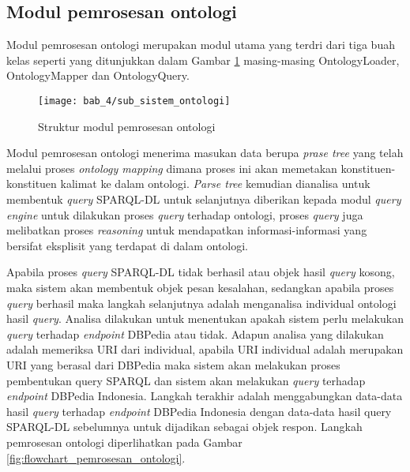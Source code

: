

\subsection{Modul pemrosesan ontologi}
Modul pemrosesan ontologi merupakan modul utama yang terdri dari tiga buah kelas seperti yang ditunjuk\-kan dalam Gambar \ref{fig:sub_sistem_ontologi} masing-masing OntologyLoader, OntologyMapper dan OntologyQuery. 

\begin{figure}[hb]
    \centering
    \texttt{[image: bab\_4/sub\_sistem\_ontologi]}
    \caption{Struktur modul pemrosesan ontologi} 
    \label{fig:sub_sistem_ontologi}
\end{figure}

Modul pemrosesan ontologi menerima masukan data berupa \emph{prase tree} yang telah melalui proses \emph{ontology mapping} dimana proses ini akan memetakan konstituen-konstituen kalimat ke dalam ontologi. \emph{Parse tree} kemudian dianalisa untuk membentuk \emph{query} SPARQL-DL untuk selanjutnya diberikan kepada modul \emph{query engine} untuk dilakukan proses \emph{query} terhadap ontologi, proses \emph{query} juga melibatkan proses \emph{reasoning} untuk mendapatkan informasi-informasi yang bersifat eksplisit yang terdapat di dalam ontologi.

Apabila proses \emph{query} SPARQL-DL tidak berhasil atau objek hasil \emph{query} kosong, maka sistem akan membentuk objek pesan kesalahan, sedangkan apabila proses \emph{query} berhasil maka langkah selanjutnya adalah menganalisa individual ontologi hasil \emph{query}. Analisa dilakukan untuk menentukan apakah sistem perlu melakukan \emph{query} terhadap \emph{endpoint} DBPedia atau tidak. Adapun analisa yang dilakukan adalah memeriksa URI dari individual, apabila URI individual adalah merupakan URI yang berasal dari DBPedia maka sistem akan melakukan proses pembentukan query SPARQL dan sistem akan melakukan \emph{query} terhadap \emph{endpoint} DBPedia Indonesia. Langkah terakhir adalah menggabungkan data-data hasil \emph{query} terhadap \emph{endpoint} DBPedia Indonesia dengan data-data hasil query SPARQL-DL sebelumnya untuk dijadikan sebagai objek respon. Langkah pemrosesan ontologi diperlihatkan pada Gambar \ref{fig:flowchart_pemrosesan_ontologi}. 

